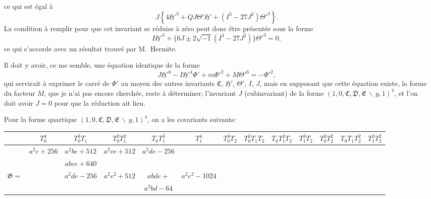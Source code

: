 \documentclass[11pt,a4paper]{book}
\begin{document}
ce qui est \'{e}gal \`{a}
\[J\left\{4\mathfrak{H}'^{3} + QJ\Theta'\mathfrak{H}' + (I^{3}-27J^{2})\Theta'^{3}\right\}.\]
La condition \`{a} remplir pour que cet invariant se r\'{e}duise \`{a} z\'{e}ro peut donc
\^{e}tre pr\'{e}sent\'{e}e sous la forme
\[I\mathfrak{H}'^{3} + \{6J \pm 2\sqrt{-1}(I^{3}-27J^{2})\}\Theta'^{3} = 0,\]
ce qui s'accorde avec un r\'{e}sultat trouv\'{e} par M.~Hermite.

Il doit y avoir, ce me semble, une \'{e}quation identique de la forme
\[J\mathfrak{H}'^{6} - I\mathfrak{H}'^{4}\Phi' + m\Phi'^{2} + M\Theta'^{6} = -\Phi'^{2},\]
qui servirait \`{a} exprimer le carr\'{e} de $\Phi'$ au moyen des autres invariants
$\mathfrak{C}$, $\mathfrak{H}'$, $\Theta'$, $I$, $J$, mais en supposant que cette \'{e}quation existe,
la forme du facteur $M$, que je n'ai pas encore cherch\'{e}e, reste \`{a} d\'{e}terminer;
l'invariant $J$ (cubinvariant) de la forme $(1,0,\mathfrak{C},\mathfrak{D},\mathfrak{E}\,\backslash\!\!\,y,1)^{4}$,
et l'on doit avoir $J = 0$ pour que la r\'{e}duction ait lieu.

\newpage

Pour la forme quartique $(1,0,\mathfrak{C},\mathfrak{D},\mathfrak{E}\,\backslash\!\!\,y,1)^{4}$,
on a les covariants suivants:

\begin{center}
\renewcommand{\arraystretch}{1.2}
\begin{tabular}{|c|c|c|c|c|c|c|c|c|c|c|c|}
\hline
& $T_{0}^{4}$ & $T_{0}^{3}T_{1}$ & $T_{0}^{2}T_{1}^{2}$ & $T_{0}T_{1}^{3}$ & $T_{1}^{4}$ & $T_{0}^{3}T_{2}$ & $T_{0}^{2}T_{1}T_{2}$ & $T_{0}T_{1}^{2}T_{2}$ & $T_{1}^{3}T_{2}$ & $T_{0}^{2}T_{2}^{2}$ & $T_{0}T_{1}T_{2}^{2}$ & $T_{1}^{2}T_{2}^{2}$ \\
\hline
& $a^{2}e+256$ & $a^{2}be+512$ & $a^{2}ce+512$ & $a^{2}de-256$ & & & & & & & & \\
& & $abce+640$ & & & & & & & & & & \\
$\mathfrak{G}=$ & & $a^{2}de-256$ & $a^{2}e^{2}+512$ & $abde+$ & $a^{2}e^{2}-1024$ & & & & & & & \\
& & & & $a^{2}bd-64$ & & & & & & & & \\
\hline
\end{tabular}
\end{center}

\newpage
\end{document}
